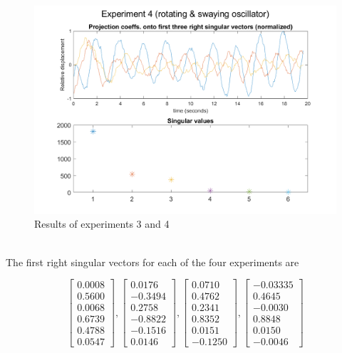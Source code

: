 \documentclass{article}
\begin{document}
\begin{figure}[!h]
	\centering
	\includegraphics[scale=0.62]{figs/fig4}
	\caption{Results of experiments 3 and 4}
\end{figure}

\newpage 
\;\\\newpage
The first right singular vectors for each of the four experiments are

\begin{equation}
	\begin{bmatrix}
		0.0008\\0.5600 \\
		0.0068 \\
		0.6739 \\
		0.4788\\
		0.0547
	\end{bmatrix}, \begin{bmatrix}
	0.0176 \\ -0.3494 \\ 0.2758 \\ -0.8822 \\ -0.1516 \\ 0.0146
\end{bmatrix}, \begin{bmatrix}
0.0710 \\ 0.4762 \\ 0.2341 \\ 0.8352 \\ 0.0151 \\ -0.1250
\end{bmatrix}, \begin{bmatrix}
-0.03335 \\ 0.4645 \\ -0.0030 \\ 0.8848 \\ 0.0150 \\ -0.0046
\end{bmatrix}
\label{eqn:vector}
\end{equation}
\end{document}
